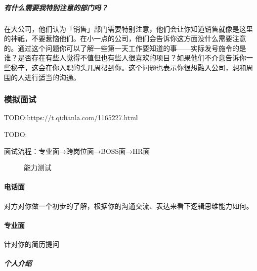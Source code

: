 \documentclass[letterpaper,11pt,english]{sphinxmanual}
\begin{document}
\subparagraph{有什么需要我特别注意的部门吗？}
\label{\detokenize{chapter_interview/HR:id15}}
在大公司，他们认为「销售」部门需要特别注意，他们会让你知道销售就像是这里的神祇，不要惹恼他们。在小一点的公司，他们会告诉你这方面没什么需要注意的。通过这个问题你可以了解一些第一天工作要知道的事——实际发号施令的是谁？是否存在有些人觉得不值但也有些人很喜欢的项目？如果他们不介意告诉你一些秘辛，这会在你入职的头几周帮到你。这个问题也表示你很想融入公司，想和周围的人进行适当的沟通。


\subsubsection{模拟面试}
\label{\detokenize{chapter_interview/simulate_interview:id1}}\label{\detokenize{chapter_interview/simulate_interview::doc}}
TODO:https://t.qidianla.com/1165227.html

TODO: 

面试流程：专业面→跨岗位面→BOSS面→HR面
%
\begin{footnote}[784]\sphinxAtStartFootnote
{}
%
\end{footnote}

\begin{figure}[H]
\centering
\capstart

\noindent{}
\caption{能力测试}\label{\detokenize{chapter_interview/simulate_interview:id13}}\end{figure}


\paragraph{电话面}
\label{\detokenize{chapter_interview/simulate_interview:id2}}
对方对你做一个初步的了解，根据你的沟通交流、表达来看下逻辑思维能力如何。


\paragraph{专业面}
\label{\detokenize{chapter_interview/simulate_interview:id3}}
针对你的简历提问


\subparagraph{个人介绍}
\label{\detokenize{chapter_interview/simulate_interview:id4}}
\end{document}
